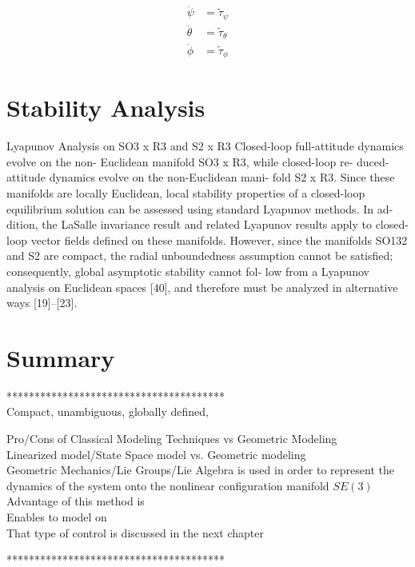 \begin{align}\label{key}
	\ddot{\psi}&=\tilde{\tau}_{\psi}\\
\ddot{\theta}&=\tilde{\tau}_{\theta}\\
\ddot{\phi} &=\tilde{\tau}_{\phi}
\end{align}

\section{Stability Analysis}
Lyapunov Analysis on SO3 x R3 and S2 x R3
Closed-loop full-attitude dynamics evolve on the non- Euclidean manifold SO3 x R3, while closed-loop re-
duced-attitude dynamics evolve on the non-Euclidean mani- fold S2 x R3. Since these manifolds are locally Euclidean, local stability properties of a closed-loop equilibrium solution can be assessed using standard Lyapunov methods. In ad- dition, the LaSalle invariance result and related Lyapunov results apply to closed-loop vector fields defined on these
manifolds. However, since the manifolds SO132 and S2 are compact, the radial unboundedness assumption cannot be satisfied; consequently, global asymptotic stability cannot fol- low from a Lyapunov analysis on Euclidean spaces [40], and therefore must be analyzed in alternative ways [19]–[23].\cite[p.43]{Chaturvedi2011}

\section{Summary}

***************************************\\
Compact, unambiguous, globally defined, 

Pro/Cons of Classical Modeling Techniques vs Geometric Modeling\\

Linearized model/State Space model vs. Geometric modeling\\


Geometric Mechanics/Lie Groups/Lie Algebra is used in order to represent the dynamics of the system onto the nonlinear configuration manifold $ SE(3) $\\
Advantage of this method is\\
Enables to model on \\
That type of control is discussed in the next chapter


***************************************\\